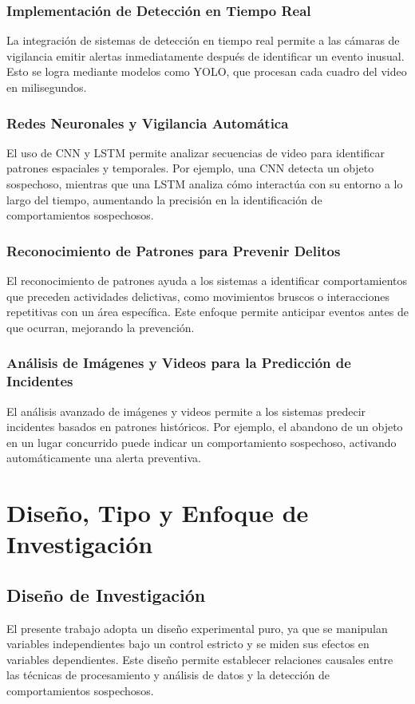 \documentclass[listof=nochaptergap,12pt,times,authoryear]{report}
\begin{document}
\subsection{Implementación de Detección en Tiempo Real}
La integración de sistemas de detección en tiempo real permite a las cámaras de vigilancia emitir alertas inmediatamente después de identificar un evento inusual. Esto se logra mediante modelos como YOLO, que procesan cada cuadro del video en milisegundos.

\subsection{Redes Neuronales y Vigilancia Automática}
El uso de CNN y LSTM permite analizar secuencias de video para identificar patrones espaciales y temporales. Por ejemplo, una CNN detecta un objeto sospechoso, mientras que una LSTM analiza cómo interactúa con su entorno a lo largo del tiempo, aumentando la precisión en la identificación de comportamientos sospechosos.

\subsection{Reconocimiento de Patrones para Prevenir Delitos}
El reconocimiento de patrones ayuda a los sistemas a identificar comportamientos que preceden actividades delictivas, como movimientos bruscos o interacciones repetitivas con un área específica. Este enfoque permite anticipar eventos antes de que ocurran, mejorando la prevención.

\subsection{Análisis de Imágenes y Videos para la Predicción de Incidentes}
El análisis avanzado de imágenes y videos permite a los sistemas predecir incidentes basados en patrones históricos. Por ejemplo, el abandono de un objeto en un lugar concurrido puede indicar un comportamiento sospechoso, activando automáticamente una alerta preventiva.


\chapter{Diseño, Tipo y Enfoque de Investigación}

\section{Diseño de Investigación}
El presente trabajo adopta un diseño experimental puro, ya que se manipulan variables independientes bajo un control estricto y se miden sus efectos en variables dependientes. Este diseño permite establecer relaciones causales entre las técnicas de procesamiento y análisis de datos y la detección de comportamientos sospechosos.
\end{document}

